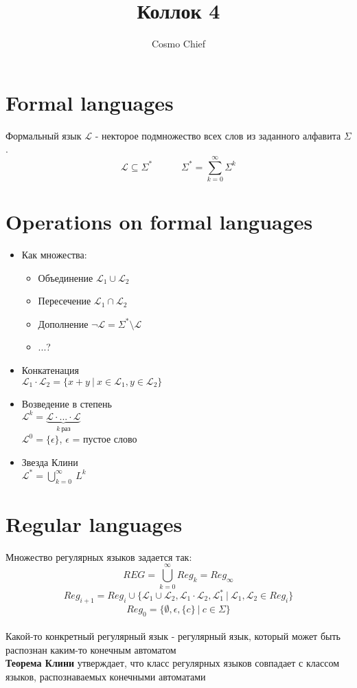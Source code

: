 \documentclass{article}
\title{Коллок 4}
\author[1]{Cosmo Chief}
\begin{document}
	\maketitle
	\tableofcontents
	\newpage
	\section{Formal languages}
	Формальный язык $\mathcal{L}$ - некторое подмножество всех слов из заданного алфавита $\Sigma$.\\
	\[
	\mathcal{L} \subseteq \Sigma^* \quad \quad \quad \Sigma^* = \sum_{k = 0}^{\infty} \Sigma^k
	\]
	
	\section{Operations on formal languages}
	\begin{itemize}
		\item
		Как множества:
		\begin{itemize}
		\item Объединение \(\mathcal{L}_1 \cup \mathcal{L}_2\)
		\item Пересечение \(\mathcal{L}_1 \cap \mathcal{L}_2\)
		\item Дополнение \(\neg \mathcal{L} = \Sigma^* \setminus \mathcal{L}\)
		\item ...?
		\end{itemize}
		\item
		Конкатенация\\
		\(\mathcal{L}_1 \cdot \mathcal{L}_2 = \{x + y \ | \ x \in \mathcal{L}_1, y \in \mathcal{L}_2\} \)
		\item
		Возведение в степень\\
		\(\mathcal{L}^k = \underbrace{\mathcal{L} \cdot ... \cdot \mathcal{L}}_{k \ \text{раз}} \)\\
		\(\mathcal{L}^0 = \{\epsilon\}\), $\epsilon$ = пустое слово
		\item
		Звезда Клини\\
		\(\mathcal{L}^* = \bigcup^{\infty}_{k = 0} \ L^k \)
	\end{itemize}
	
	\section{Regular languages}
	Множество регулярных языков задается так:\\
	\[
	REG = \bigcup^{\infty}_{k = 0} Reg_k = Reg_{\infty}\]
	\[
	Reg_{i+1} = Reg_{i} \cup \{\mathcal{L}_1 \cup \mathcal{L}_2, \mathcal{L}_1 \cdot \mathcal{L}_2, \mathcal{L}^{*}_{1} \ | \ \mathcal{L}_1, \mathcal{L}_2 \in Reg_i\}\]
	\[
	Reg_0 = \{\emptyset, \epsilon, \{c\} \ | \ c \in \Sigma\}\]\\
	Какой-то конкретный регулярный язык - регулярный язык, который может быть распознан каким-то конечным автоматом\\
	\textbf{Теорема Клини} утверждает, что класс регулярных языков совпадает с классом языков, распознаваемых конечными автоматами
	
\end{document}
